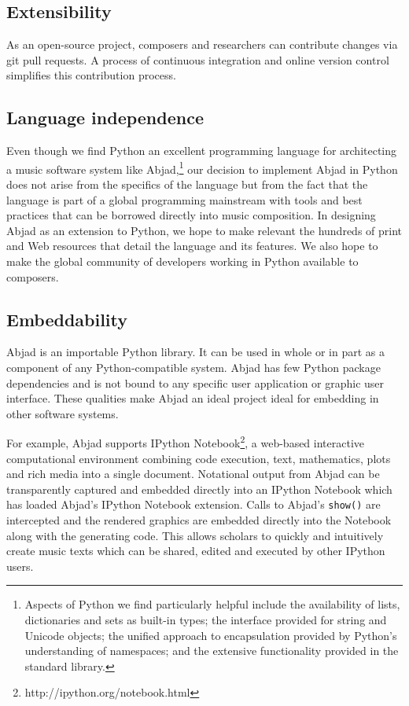 \documentclass{article}
\begin{document}
\subsection{Extensibility}

As an open-source project, composers and researchers can contribute changes via
git pull requests. A process of continuous integration and online version
control simplifies this contribution process.

\subsection{Language independence}

Even though we find Python an excellent programming
language for architecting a music software system like Abjad,\footnote{Aspects
of Python we find particularly helpful include the availability of lists,
dictionaries and sets as built-in types; the interface provided for string and
Unicode objects; the unified approach to encapsulation provided by Python's
understanding of namespaces; and the extensive functionality provided in the
standard library.} our decision to implement Abjad in Python does not arise
from the specifics of the language but from the fact that the language is part
of a global programming mainstream with tools and best practices that can be
borrowed directly into music composition. In designing Abjad as an extension to
Python, we hope to make relevant the hundreds of print and Web resources that
detail the language and its features. We also hope to make the global community
of developers working in Python available to composers.

\subsection{Embeddability}

Abjad is an importable Python library. It can be used in whole or in part as a
component of any Python-compatible system. Abjad has few Python package
dependencies and is not bound to any specific user application or graphic user
interface. These qualities make Abjad an ideal project ideal for embedding in
other software systems.

For example, Abjad supports IPython
Notebook\footnote{http://ipython.org/notebook.html}, a web-based interactive
computational environment combining code execution, text, mathematics, plots
and rich media into a single document. Notational output from Abjad can be
transparently captured and embedded directly into an IPython Notebook which has
loaded Abjad's IPython Notebook extension. Calls to Abjad's \texttt{show()} are
intercepted and the rendered graphics are embedded directly into the Notebook
along with the generating code. This allows scholars to quickly and intuitively
create music texts which can be shared, edited and executed by other IPython
users.
\end{document}

